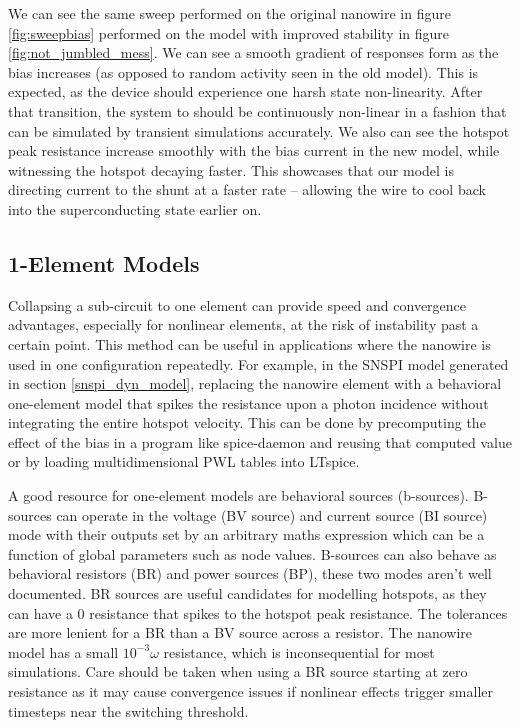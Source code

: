 We can see the same sweep performed on the original nanowire in figure \ref{fig:sweepbias}
performed on the model with improved stability in figure \ref{fig:not_jumbled_mess}. We can see
a smooth gradient of responses form as the bias increases (as opposed to random activity seen
in the old model). This is expected, as the device should experience one harsh state non-linearity.
After that transition, the system to should be continuously non-linear in a fashion that can be simulated
by transient simulations accurately. We also can see the hotspot peak resistance increase smoothly
with the bias current in the new model, while witnessing the hotspot decaying faster. This showcases
that our model is directing current to the shunt at a faster rate -- allowing the wire to cool back into the
superconducting state earlier on.

\subsection{1-Element Models}

Collapsing a sub-circuit to one element can provide speed and convergence advantages, especially for
nonlinear elements, at the risk of instability past a certain point. This method can be useful in
applications where the nanowire is used in one configuration repeatedly. For example, in the SNSPI
model generated in section \ref{snspi_dyn_model}, replacing the nanowire element with a behavioral
one-element model that spikes the resistance upon a photon incidence without integrating the entire
hotspot velocity. This can be done by precomputing the effect of the bias in a program like spice-daemon
and reusing that computed value or by loading multidimensional PWL tables into LTspice.

A good resource for one-element models are behavioral sources (b-sources). B-sources can operate
in the voltage (BV source) and current source (BI source) mode with their outputs set by an arbitrary 
maths expression
which can be a function of global parameters such as node values. B-sources can also behave
as behavioral resistors (BR) and power sources (BP), these two modes aren't well documented.
BR sources are useful candidates for modelling hotspots, as they can have a 0 resistance that spikes
to the hotspot peak resistance. The tolerances are more lenient for a BR than a BV source across
a resistor. The nanowire model has a small $10^{-3}\omega$ resistance, which is inconsequential for
most simulations. Care should be taken when using a BR source starting at zero resistance as it
may cause convergence issues if nonlinear effects trigger smaller timesteps near the switching
threshold.

